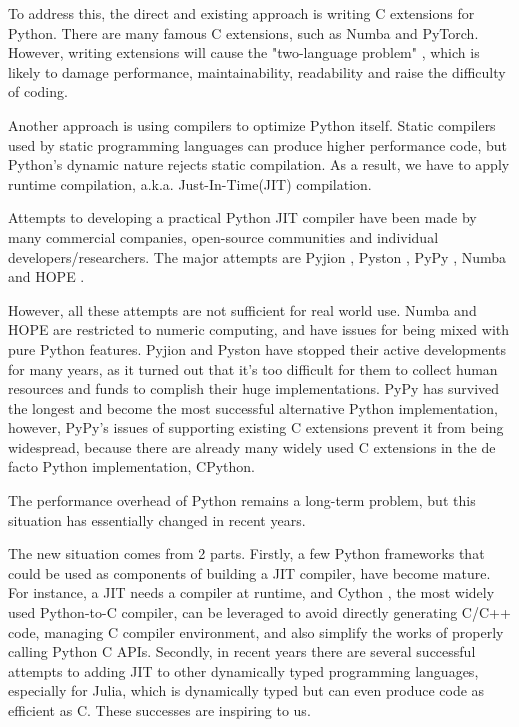 \documentclass[conference]{IEEEtran}
\begin{document}
To address this, the direct and existing approach is writing C extensions for Python.
There are many famous C extensions, such as Numba and PyTorch. However, writing extensions will cause the "two-language problem" \cite {bezanson2017julia},
which is likely to damage performance, maintainability, readability and raise the difficulty of coding.

Another approach is using compilers to optimize Python itself.
Static compilers used by static programming languages can produce higher performance code, but Python's dynamic nature rejects static
compilation. As a result, we have to apply runtime compilation, a.k.a. Just-In-Time(JIT) compilation.

Attempts to developing a practical Python JIT compiler have been made by many commercial companies, open-source communities and individual developers/researchers.
The major attempts are Pyjion \cite {pyjion:2018}, Pyston \cite {pyston:2017}, PyPy \cite {bolz2009tracing},
Numba \cite {lam2015numba} and HOPE \cite {akeret2015hope}.

However, all these attempts are not sufficient for real world use. Numba and HOPE are restricted to numeric computing, and have issues for being mixed with pure Python features.
Pyjion and Pyston have stopped their active developments for many years, as it turned out that it's too difficult for them to collect human resources and funds to complish their huge implementations.
PyPy has survived the longest and become the most successful alternative Python implementation, however,
PyPy's issues of supporting existing C extensions prevent it from being widespread,
because there are already many widely used C extensions in the de facto Python implementation, CPython.

The performance overhead of Python remains a long-term problem, but this situation has essentially changed in recent years.

The new situation comes from 2 parts. Firstly, a few Python frameworks that could be used as components of building a JIT compiler,
have become mature. For instance, a JIT needs a compiler at runtime, and Cython \cite {behnel2011cython},
the most widely used Python-to-C compiler, can be leveraged to avoid directly generating C/C++ code, managing C compiler environment,
and also simplify the works of properly calling Python C APIs. Secondly, in recent years there are several successful attempts to adding JIT to other dynamically typed programming languages, especially for Julia,
which is dynamically typed but can even produce code as efficient as C. These successes are inspiring to us.
\end{document}
